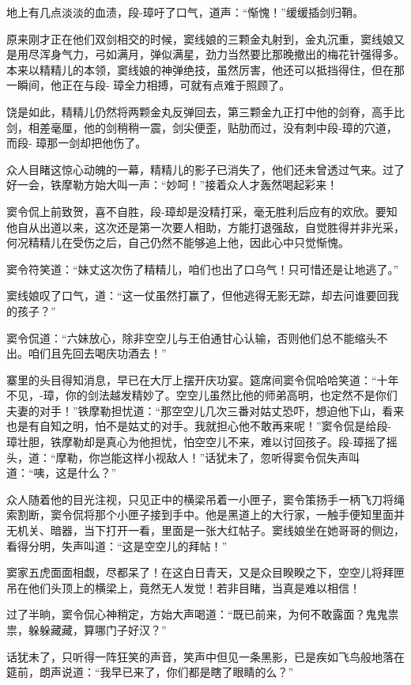 \documentclass[12pt,oneside]{book}
\begin{document}
地上有几点淡淡的血渍，段-璋吁了口气，道声：``惭愧！''缓缓插剑归鞘。

原来刚才正在他们双剑相交的时候，窦线娘的三颗金丸射到，金丸沉重，窦线娘又是用尽浑身气力，弓如满月，弹似满星，劲力当然要比那晚撤出的梅花针强得多。本来以精精儿的本领，窦线娘的神弹绝技，虽然厉害，他还可以抵挡得住，但在那一瞬间，他正在与段-
璋全力相搏，可就有点难于照顾了。

饶是如此，精精儿仍然将两颗金丸反弹回去，第三颗金九正打中他的剑脊，高手比剑，相差毫厘，他的剑稍稍一震，剑尖便歪，贴肋而过，没有刺中段-璋的穴道，而段-
璋那一剑却把他伤了。

众人目睹这惊心动魄的一幕，精精儿的影子已消失了，他们还未曾透过气来。过了好一会，铁摩勒方始大叫一声：``妙呵！''接着众人才轰然喝起彩来！

窦令侃上前致贺，喜不自胜，段-璋却是没精打采，毫无胜利后应有的欢欣。要知他自从出道以来，这次还是第一次要人相助，方能打退强敌，自觉胜得并非光采，何况精精儿在受伤之后，自己仍然不能够追上他，因此心中只觉惭愧。

窦令符笑道：``妹丈这次伤了精精儿，咱们也出了口乌气！只可惜还是让地逃了。''

窦线娘叹了口气，道：``这一仗虽然打赢了，但他逃得无影无踪，却去问谁要回我的孩子？''

窦令侃道：``六妹放心，除非空空儿与王伯通甘心认输，否则他们总不能缩头不出。咱们且先回去喝庆功酒去！''

寨里的头目得知消息，早已在大厅上摆开庆功宴。筵席间窦令侃哈哈笑道：``十年不见，-璋，你的剑法越发精妙了。空空儿虽然比他的师弟高明，也定然不是你们夫妻的对手！''铁摩勒担忧道：``那空空儿几次三番对姑丈恐吓，想迫他下山，看来也是有自知之明，怕不是姑丈的对手。我就担心他不敢再来呢！''窦令侃是给段-
璋壮胆，铁摩勒却是真心为他担忧，怕空空儿不来，难以讨回孩子。段-璋摇了摇头，道：``摩勒，你岂能这样小视敌人！''话犹未了，忽听得窦令侃失声叫道：``咦，这是什么？''

众人随着他的目光注视，只见正中的横梁吊着一小匣子，窦令策扬手一柄飞刀将绳索割断，窦令侃将那个小匣子接到手中。他是黑道上的大行家，一触手便知里面并无机关、暗器，当下打开一看，里面是一张大红帖子。窦线娘坐在她哥哥的侧边，看得分明，失声叫道：``这是空空儿的拜帖！''

窦家五虎面面相觑，尽都呆了！在这白日青天，又是众目睽睽之下，空空儿将拜匣吊在他们头顶上的横梁上，竟然无人发觉！若非目睹，当真是难以相信！

过了半晌，窦令侃心神稍定，方始大声喝道：``既已前来，为何不敢露面？鬼鬼祟祟，躲躲藏藏，算哪门子好汉？''

话犹未了，只听得一阵狂笑的声音，笑声中但见一条黑影，已是疾如飞鸟般地落在筵前，朗声说道：``我早已来了，你们都是瞎了眼睛的么？''
\end{document}
